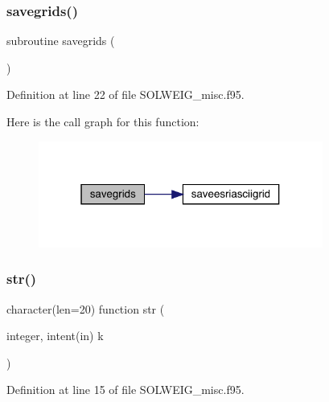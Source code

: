 \subsubsection{\texorpdfstring{savegrids()}{savegrids()}}
{\footnotesize\ttfamily subroutine savegrids (\begin{DoxyParamCaption}{ }\end{DoxyParamCaption})}



Definition at line 22 of file S\+O\+L\+W\+E\+I\+G\+\_\+misc.\+f95.

Here is the call graph for this function\+:\nopagebreak
\begin{figure}[H]
\begin{center}
\leavevmode
\includegraphics[width=265pt]{_s_o_l_w_e_i_g__misc_8f95_a941631427d9d11a73344f3d18d18193f_cgraph}
\end{center}
\end{figure}
\mbox{\label{_s_o_l_w_e_i_g__misc_8f95_a77a2ca74046c88062aa8333bf1eaca05}} 
\subsubsection{\texorpdfstring{str()}{str()}}
{\footnotesize\ttfamily character(len=20) function str (\begin{DoxyParamCaption}\item[{integer, intent(in)}]{k }\end{DoxyParamCaption})}



Definition at line 15 of file S\+O\+L\+W\+E\+I\+G\+\_\+misc.\+f95.

